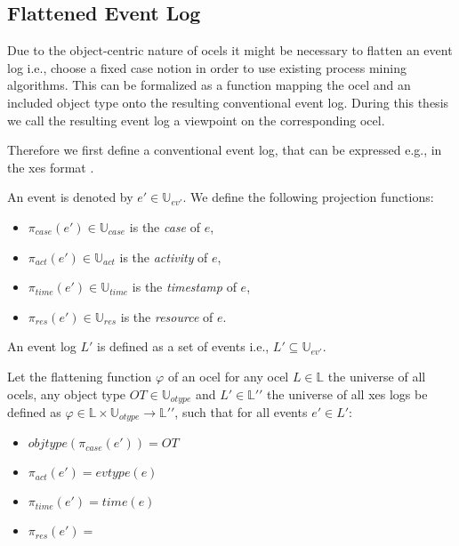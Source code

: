 \subsection{Flattened Event Log}
Due to the object-centric nature of \acp{ocel} it might be necessary to flatten an event log i.e., choose a fixed case notion in order to use existing process mining algorithms. This can be formalized as a function mapping the \ac{ocel} and an included object type onto the resulting conventional event log. During this thesis we call the resulting event log a viewpoint on the corresponding \ac{ocel}.

Therefore we first define a conventional event log, that can be expressed e.g., in the \ac{xes} format \autocite{DBLP:journals/cim/AcamporaVSAGV17}.

\begin{definition}\label{xes-event-log}
An event is denoted by $e' \in \mathbb{U}_{\mathit{ev'}}$. We define the following projection functions:
	\begin{itemize}
  		\item $\pi_{\mathit{case}}(e') \in \mathbb{U}_{\mathit{case}}$ is the \emph{case} of $e$,
  		\item $\pi_{\mathit{act}}(e') \in \mathbb{U}_{\mathit{act}}$ is the \emph{activity} of $e$,
  		\item $\pi_{\mathit{time}}(e') \in \mathbb{U}_{\mathit{time}}$ is the \emph{timestamp} of $e$,
  		\item $\pi_{\mathit{res}}(e') \in \mathbb{U}_{\mathit{res}}$ is the \emph{resource} of $e$.
	\end{itemize}
	An event log $L'$ is defined as a set of events i.e., $L' \subseteq \mathbb{U}_{\mathit{ev'}}$.
\end{definition}

\begin{definition}\label{def:flatten-event-log}
Let the flattening function $\varphi$ of an \ac{ocel} for any \ac{ocel} $L \in \mathbb{L}$ the universe of all \acp{ocel}, any object type $OT \in \mathbb{U}_{otype}$ and $L' \in \mathbb{L'}'$ the universe of all \ac{xes} logs be defined as $\varphi \in \mathbb{L} \times \mathbb{U}_{otype} \rightarrow \mathbb{L'}'$, such that for all events $e' \in L'$:
	\begin{itemize}
		\item $objtype(\pi_{\mathit{case}}(e')) = OT$ 
		\item $\pi_{\mathit{act}}(e') = evtype(e)$
		\item $\pi_{\mathit{time}}(e') = time(e)$
		\item $\pi_{\mathit{res}}(e') = $
	\end{itemize}
\end{definition}